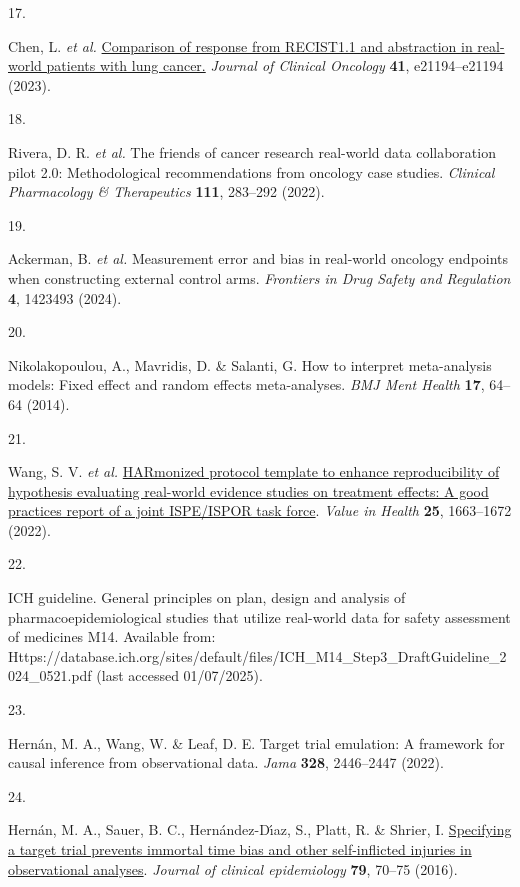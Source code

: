 \documentclass[
  letterpaper,
  DIV=11,
  numbers=noendperiod]{scrartcl}
\newlength{\cslhangindent}
\newlength{\csllabelwidth}
\newenvironment{CSLReferences}[2] %
 {\begin{list}{}{%
  \setlength{\itemindent}{0pt}
  \setlength{\leftmargin}{0pt}
  \setlength{\parsep}{0pt}
  \ifodd #1
   \setlength{\leftmargin}{\cslhangindent}
   \setlength{\itemindent}{-1\cslhangindent}
  \fi
  \setlength{\itemsep}{#2\baselineskip}}}
 {\end{list}}
\newcommand{\CSLLeftMargin}[1]{\parbox[t]{\csllabelwidth}{\strut#1\strut}}
\newcommand{\CSLRightInline}[1]{\parbox[t]{\linewidth - \csllabelwidth}{\strut#1\strut}}
\begin{document}
\begin{CSLReferences}{0}{0}
\CSLLeftMargin{17. }%
\CSLRightInline{Chen, L. \emph{et al.}
\href{https://doi.org/10.1200/JCO.2023.41.16/_suppl.e21194}{Comparison
of response from RECIST1.1 and abstraction in real-world patients with
lung cancer.} \emph{Journal of Clinical Oncology} \textbf{41},
e21194--e21194 (2023).}

\CSLLeftMargin{18. }%
\CSLRightInline{Rivera, D. R. \emph{et al.} The friends of cancer
research real-world data collaboration pilot 2.0: Methodological
recommendations from oncology case studies. \emph{Clinical Pharmacology
\& Therapeutics} \textbf{111}, 283--292 (2022).}

\CSLLeftMargin{19. }%
\CSLRightInline{Ackerman, B. \emph{et al.} Measurement error and bias in
real-world oncology endpoints when constructing external control arms.
\emph{Frontiers in Drug Safety and Regulation} \textbf{4}, 1423493
(2024).}

\CSLLeftMargin{20. }%
\CSLRightInline{Nikolakopoulou, A., Mavridis, D. \& Salanti, G. How to
interpret meta-analysis models: Fixed effect and random effects
meta-analyses. \emph{BMJ Ment Health} \textbf{17}, 64--64 (2014).}

\CSLLeftMargin{21. }%
\CSLRightInline{Wang, S. V. \emph{et al.}
\href{https://doi.org/10.1016/j.jval.2022.09.001}{HARmonized protocol
template to enhance reproducibility of hypothesis evaluating real-world
evidence studies on treatment effects: A good practices report of a
joint ISPE/ISPOR task force}. \emph{Value in Health} \textbf{25},
1663--1672 (2022).}

\CSLLeftMargin{22. }%
\CSLRightInline{ICH guideline. General principles on plan, design and
analysis of pharmacoepidemiological studies that utilize real-world data
for safety assessment of medicines M14. Available from:
Https://database.ich.org/sites/default/files/ICH\_M14\_Step3\_DraftGuideline\_2024\_0521.pdf
(last accessed 01/07/2025). }

\CSLLeftMargin{23. }%
\CSLRightInline{Hernán, M. A., Wang, W. \& Leaf, D. E. Target trial
emulation: A framework for causal inference from observational data.
\emph{Jama} \textbf{328}, 2446--2447 (2022).}

\CSLLeftMargin{24. }%
\CSLRightInline{Hernán, M. A., Sauer, B. C., Hernández-Dı́az, S., Platt,
R. \& Shrier, I.
\href{https://doi.org/10.1016/j.jclinepi.2016.04.014}{Specifying a
target trial prevents immortal time bias and other self-inflicted
injuries in observational analyses}. \emph{Journal of clinical
epidemiology} \textbf{79}, 70--75 (2016).}


\end{CSLReferences}
\end{document}
